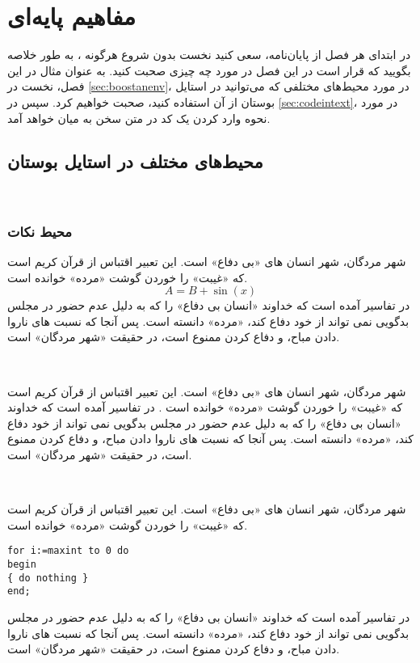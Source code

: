 \chapter{مفاهیم پایه‌ای}
\label{chap:concepts}
در ابتدای هر فصل از پایان‌نامه، سعی کنید نخست بدون شروع هرگونه 
، 
به طور خلاصه بگویید که قرار است در این فصل در مورد چه چیزی صحبت کنید. به عنوان مثال در این فصل، نخست در 
\autoref{sec:boostanenv}،
در مورد محیط‌های مختلفی که می‌توانید در استایل بوستان از آن استفاده کنید، صحبت خواهیم کرد. سپس در 
\autoref{sec:codeintext}،
در مورد نحوه وارد کردن یک کد در متن سخن به میان خواهد آمد. 

\section{محیط‌های مختلف در استایل بوستان}
\label{sec:boostanenv}
‎\ptext[1]
\subsection{محیط نکات}
\begin{note}
شهر مردگان، شهر انسان های «بی دفاع» است. این تعبیر اقتباس از قرآن کریم است که «غیبت» را خوردن گوشت «مرده» خوانده است. 
\begin{equation}
A = B + \sin (x)
\end{equation}
در تفاسیر آمده است که خداوند «انسان بی دفاع» را که به دلیل عدم حضور در مجلس بدگویی نمی تواند از خود دفاع کند، «مرده» دانسته است. پس آنجا که نسبت های ناروا دادن مباح، و دفاع کردن ممنوع است، در حقیقت «شهر مردگان» است.
\end{note}
‎\ptext[2]
\begin{problem}
شهر مردگان، شهر انسان های «بی دفاع» است. این تعبیر اقتباس از قرآن کریم است که «غیبت» را خوردن گوشت «مرده» خوانده است . در تفاسیر آمده است که خداوند «انسان بی دفاع» را که به دلیل عدم حضور در مجلس بدگویی نمی تواند از خود دفاع کند، «مرده» دانسته است. پس آنجا که نسبت های ناروا دادن مباح، و دفاع کردن ممنوع است، در حقیقت «شهر مردگان» است.


\end{problem}
‎\ptext[3]
\begin{refer}
شهر مردگان، شهر انسان های «بی دفاع» است. این تعبیر اقتباس از قرآن کریم است که «غیبت» را خوردن گوشت «مرده» خوانده است.
\begin{latin}
\lstset{numbers=none,frame=none}
\begin{lstlisting}
for i:=maxint to 0 do
begin
{ do nothing }
end;
\end{lstlisting}
\end{latin}
  در تفاسیر آمده است که خداوند «انسان بی دفاع» را که به دلیل عدم حضور در مجلس بدگویی نمی تواند از خود دفاع کند، «مرده» دانسته است. پس آنجا که نسبت های ناروا دادن مباح، و دفاع کردن ممنوع است، در حقیقت «شهر مردگان» است.
\end{refer}

